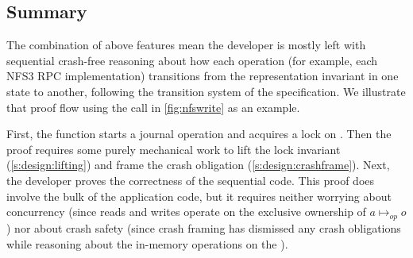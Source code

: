 \subsection{Summary}
\label{s:design:summary}


The combination of above features mean the developer is mostly left with
sequential crash-free reasoning about how each operation (for example, each NFS3 RPC
implementation) transitions from the representation invariant in one state to
another, following the transition system of the specification. We
illustrate that proof flow using the  call in
\cref{fig:nfswrite} as an example.



First, the function starts a journal operation and acquires a lock on . Then the proof
requires some purely mechanical work to lift the lock invariant
(\cref{s:design:lifting}) and frame the crash obligation
(\cref{s:design:crashframe}). Next, the developer proves the correctness of
the sequential code. This proof does involve the bulk of the application code,
but it requires neither worrying about concurrency (since reads and writes
operate on the exclusive ownership of $a \mapsto_{\mathit{op}} o$) nor about crash safety
(since crash framing has dismissed any crash obligations while reasoning
about the in-memory operations on the ).

